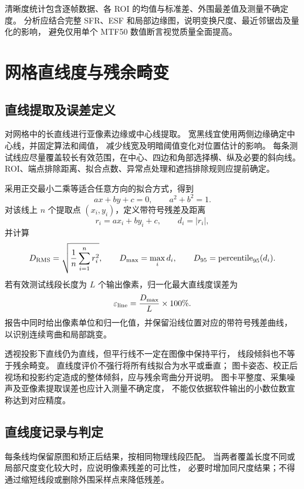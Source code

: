 清晰度统计包含逐帧数据、各 ROI 的均值与标准差、外围最差值及测量不确定度。
分析应结合完整 SFR、ESF 和局部边缘图，说明变换尺度、最近邻锯齿及量化的影响，
避免仅用单个 MTF50 数值断言视觉质量全面提高。


\section{网格直线度与残余畸变}
\subsection{直线提取及误差定义}
对网格中的长直线进行亚像素边缘或中心线提取。
宽黑线宜使用两侧边缘确定中心线，并固定算法和阈值，
减少线宽及明暗阈值变化对位置估计的影响。
每条测试线应尽量覆盖较长有效范围，在中心、四边和角部选择横、纵及必要的斜向线。
ROI、端点排除距离、拟合点数、异常点处理和遮挡排除规则应提前确定。

采用正交最小二乘等适合任意方向的拟合方式，得到
\begin{equation}
ax+by+c=0,\qquad a^2+b^2=1.
\end{equation}
对该线上 $n$ 个提取点 $(x_i,y_i)$，定义带符号残差及距离
\begin{equation}
r_i=ax_i+by_i+c,\qquad d_i=|r_i|,
\end{equation}
并计算
\begin{equation}
D_{\rm RMS}=\sqrt{\frac{1}{n}\sum_{i=1}^{n}r_i^2},\qquad
D_{\max}=\max_i d_i,\qquad
D_{95}=\operatorname{percentile}_{95}(d_i).
\end{equation}
若有效测试线段长度为 $L$ 个输出像素，归一化最大直线度误差为
\begin{equation}
\varepsilon_{\rm line}=\frac{D_{\max}}{L}\times100\%.
\label{eq:quality-linearity}
\end{equation}
报告中同时给出像素单位和归一化值，并保留沿线位置对应的带符号残差曲线，
以识别连续弯曲和局部跳变。

透视投影下直线仍为直线，但平行线不一定在图像中保持平行，
线段倾斜也不等于残余畸变。
直线度评价不强行将所有线拟合为水平或垂直；
图卡姿态、校正后视场和投影约定造成的整体倾斜，应与残余弯曲分开说明。
图卡平整度、采集噪声及亚像素提取误差也应计入测量不确定度，
不能仅依据软件输出的小数位数宣称达到对应精度。

\subsection{直线度记录与判定}
每条线均保留原图和矫正后结果，按相同物理线段匹配。
当两者覆盖长度不同或局部尺度变化较大时，应说明像素残差的可比性，
必要时增加同尺度结果；不得通过缩短线段或删除外围采样点来降低残差。

